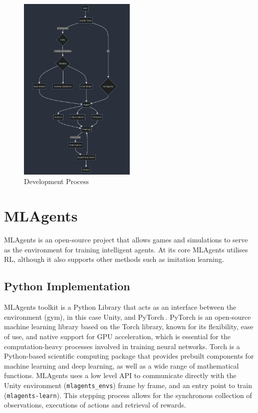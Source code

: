 \begin{figure}[h]
    \centering
    \includegraphics[width=0.5\textwidth]{Images/method.png}
    \caption{Development Process}\label{development_process}
\end{figure}

\section{MLAgents}
MLAgents is an open-source project that allows games and simulations to serve as the environment for training intelligent agents. At its core MLAgents utilises RL, although it also supports other methods such as imitation learning.

\subsection{Python Implementation}

MLAgents toolkit is a Python Library that acts as an interface between the environment (gym), in this case Unity, and PyTorch$~$\cite{paszke2019pytorch}. PyTorch is an open-source machine learning library based on the Torch library, known for its flexibility, ease of use, and native support for GPU acceleration, which is essential for the computation-heavy processes involved in training neural networks. Torch is a Python-based scientific computing package that provides prebuilt components for machine learning and deep learning, as well as a wide range of mathematical functions. MLAgents uses a low level API to communicate directly with the Unity environment (\texttt{mlagents\_envs}) frame by frame, and an entry point to train (\texttt{mlagents-learn}). This stepping process allows for the synchronous collection of observations, executions of actions and retrieval of rewards. 


